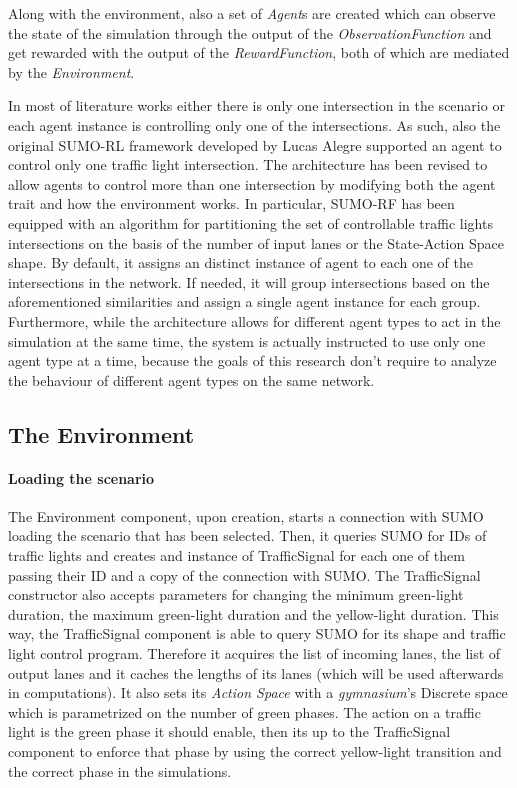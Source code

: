 Along with the environment, also a set of \textit{Agent}s are created which can observe the state of the simulation through the output of the \textit{ObservationFunction} and get rewarded with the output of the \textit{RewardFunction}, both of which are mediated by the \textit{Environment}.

In most of literature works either there is only one intersection in the scenario or each agent instance is controlling only one of the intersections. As such, also the original SUMO-RL framework \cite{sumorl} developed by Lucas Alegre supported an agent to control only one traffic light intersection.
The architecture has been revised to allow agents to control more than one intersection by modifying both the agent trait and how the environment works.
In particular, SUMO-RF has been equipped with an algorithm for partitioning the set of controllable traffic lights intersections on the basis of the number of input lanes or the State-Action Space shape.
By default, it assigns an distinct instance of agent to each one of the intersections in the network. If needed, it will group intersections based on the aforementioned similarities and assign a single agent instance for each group.
Furthermore, while the architecture allows for different agent types to act in the simulation at the same time, the system is actually instructed to use only one agent type at a time, because the goals of this research don't require to analyze the behaviour of different agent types on the same network.


\subsection{The Environment}


\paragraph{Loading the scenario}

The Environment component, upon creation, starts a connection with SUMO loading the scenario that has been selected. Then, it queries SUMO for IDs of traffic lights and creates and instance of TrafficSignal for each one of them passing their ID and a copy of the connection with SUMO.
The TrafficSignal constructor also accepts parameters for changing the minimum green-light duration, the maximum green-light duration and the yellow-light duration.
This way, the TrafficSignal component is able to query SUMO for its shape and traffic light control program.
Therefore it acquires the list of incoming lanes, the list of output lanes and it caches the lengths of its lanes (which will be used afterwards in computations).
It also sets its \textit{Action Space} with a \textit{gymnasium}'s Discrete space which is parametrized on the number of green phases.
The action on a traffic light is the green phase it should enable, then its up to the TrafficSignal component to enforce that phase by using the correct yellow-light transition and the correct phase in the simulations.

